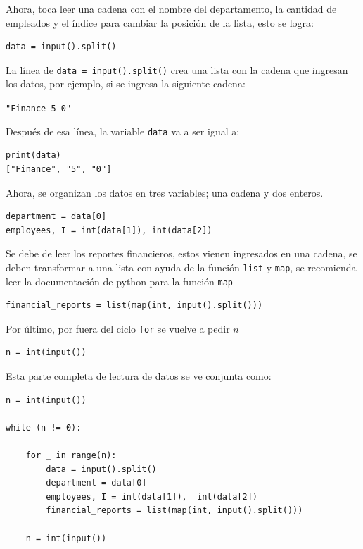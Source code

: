\documentclass{article}
\begin{document}
Ahora, toca leer una cadena con el nombre del departamento, la cantidad de empleados y el índice para cambiar la posición de la lista, esto se logra:

\begin{lstlisting}[style=pythonstyle]
data = input().split()
\end{lstlisting}

La línea de \lstinline[style=pythonstyle]|data = input().split()| crea una lista con la cadena que ingresan los datos, por ejemplo, si se ingresa la siguiente cadena:

\texttt{"Finance 5 0"}

Después de esa línea, la variable \texttt{data} va a ser igual a:

\begin{lstlisting}[style=pythonstyle]
print(data)
["Finance", "5", "0"]
\end{lstlisting}

Ahora, se organizan los datos en tres variables; una cadena y dos enteros.

\begin{lstlisting}[style=pythonstyle]
department = data[0]
employees, I = int(data[1]), int(data[2])
\end{lstlisting}

Se debe de leer los reportes financieros, estos vienen ingresados en una cadena, se deben transformar a una lista con ayuda de la función \lstinline[style=pythonstyle]|list| y \lstinline[style=pythonstyle]|map|, se recomienda leer la documentación de python para la función \lstinline[style=pythonstyle]|map|

\begin{lstlisting}[style=pythonstyle]
financial_reports = list(map(int, input().split()))
\end{lstlisting}

Por último, por fuera del ciclo \lstinline[style=pythonstyle]|for| se vuelve a pedir \(n\)

\begin{lstlisting}[style=pythonstyle]
n = int(input())
\end{lstlisting}

Esta parte completa de lectura de datos se ve conjunta como:

\begin{lstlisting}[style=pythonstyle]
n = int(input())

while (n != 0):

    for _ in range(n):
        data = input().split()
        department = data[0]
        employees, I = int(data[1]),  int(data[2])
        financial_reports = list(map(int, input().split()))

    n = int(input())
\end{lstlisting}
\end{document}
